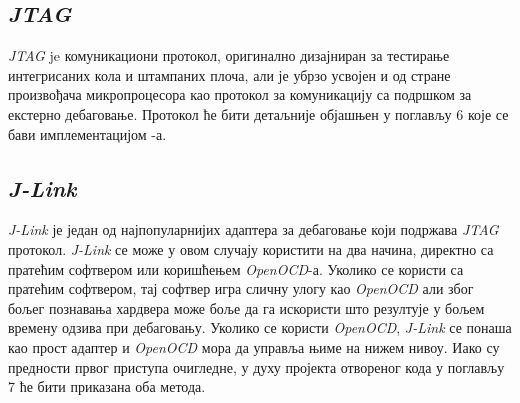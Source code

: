 \subsection{\textit{\acrshort{JTAG}}}

\textit{\acrfull{JTAG}}\cite{jtag_spec} je комуникациони протокол, оригинално дизајниран за тестирање интегрисаних кола и штампаних плоча, али је убрзо усвојен и од стране произвођача микропроцесора као протокол за комуникацију са подршком за екстерно дебаговање. Протокол ће бити детаљније објашњен у поглављу 6 које се бави имплементацијом -а.

\subsection{\textit{J-Link}}

\textit{J-Link}\cite{jlink} је један од најпопуларнијих адаптера за дебаговање који подржава \textit{\acrshort{JTAG}} протокол.
\textit{J-Link} се може у овом случају користити на два начина, директно са пратећим софтвером или коришћењем \textit{Open\acrshort{OCD}}-а. Уколико се користи са пратећим софтвером, тај софтвер игра сличну улогу као \textit{Open\acrshort{OCD}} али због бољег познавања хардвера може боље да га искористи што резултује у бољем времену одзива при дебаговању. Уколико се користи \textit{Open\acrshort{OCD}}, \textit{J-Link} се понаша као прост адаптер и \textit{Open\acrshort{OCD}} мора да управља њиме на нижем нивоу. Иако су предности првог приступа очигледне, у духу пројекта отвореног кода у поглављу 7 ће бити приказана оба метода.